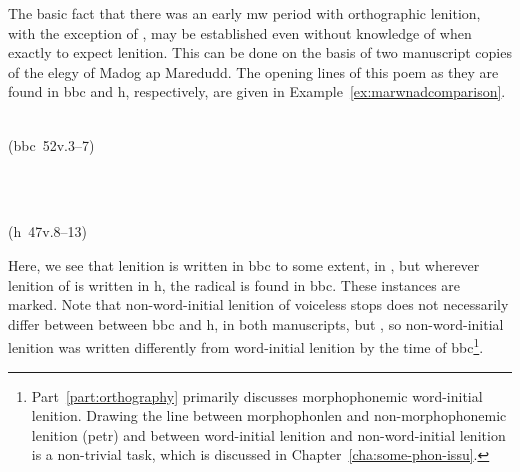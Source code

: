 The basic fact that there was an early \gls{mw} period with orthographic lenition, with the exception of \lT, may be established even without knowledge of when exactly to expect lenition. This can be done on the basis of two manuscript copies of the elegy of Madog ap Maredudd. The opening lines of this poem as they are found in \gls{bbc}  and \gls{h}, respectively, are given in Example~\ref{ex:marwnadcomparison}.
\begin{mwl}
\item%
  \begin{minipage}[t]{0.45\textwidth}
    \\
    (\acrshort{bbc}~52v.3--7)
  \end{minipage}~
  \begin{minipage}[t]{0.45\textwidth}
    \\
    (\acrshort{h}~47v.8--13)
  \end{minipage}
  \label{ex:marwnadcomparison}
\end{mwl}
Here, we see that lenition is written in \gls{bbc} to some extent, \eg in , but wherever lenition  of  is written in \gls{h}, the radical is found in \gls{bbc}. These instances are marked. Note that non-word-initial lenition of voiceless stops does not necessarily differ between between \gls{bbc} and \gls{h}, \cf {} in both manuscripts, but , so non-word-initial lenition was written differently from word-initial lenition by the time of \gls{bbc}\footnote{Part~\ref{part:orthography} primarily discusses morphophonemic word-initial lenition. Drawing the line between \gls{morphophonlen} and non-morphophonemic lenition (\gls{petr}) and between  word-initial lenition and non-word-initial lenition is a non-trivial task, which is discussed in Chapter~\ref{cha:some-phon-issu}.}.

